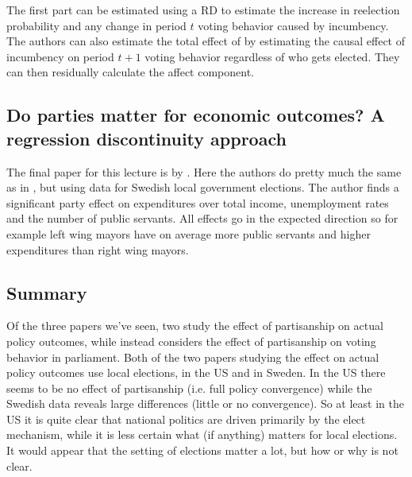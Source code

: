 The first part can be estimated using a RD to estimate the increase in reelection probability and any change in period $t$ voting behavior caused by incumbency. The authors can also estimate the total effect of by estimating the causal effect of incumbency on period $t+1$ voting behavior regardless of who gets elected. They can then residually calculate the affect component. 


\subsection{Do parties matter for economic outcomes? A regression discontinuity approach}
The final paper for this lecture is by \cite{pettersson-lidbom_parties_2008}. Here the authors do pretty much the same as in \cite{ferreira_political_2007}, but using data for Swedish local government elections. The author finds a significant party effect on expenditures over total income, unemployment rates and the number of public servants. All effects go in the expected direction so for example left wing mayors have on average more public servants and higher expenditures than right wing mayors.


\subsection{Summary}
Of the three papers we've seen, two study the effect of partisanship on actual policy outcomes, while \cite{lee_voters_2004} instead considers the effect of partisanship on voting behavior in parliament. Both of the two papers studying the effect on actual policy outcomes use local elections, \cite{ferreira_political_2007} in the US and \cite{pettersson-lidbom_parties_2008} in Sweden. In the US there seems to be no effect of partisanship (i.e. full policy convergence) while the Swedish data reveals large differences (little or no convergence). So at least in the US it is quite clear that national politics are driven primarily by the elect mechanism, while it is less certain what (if anything) matters for local elections. It would appear that the setting of elections matter a lot, but how or why is not clear.
